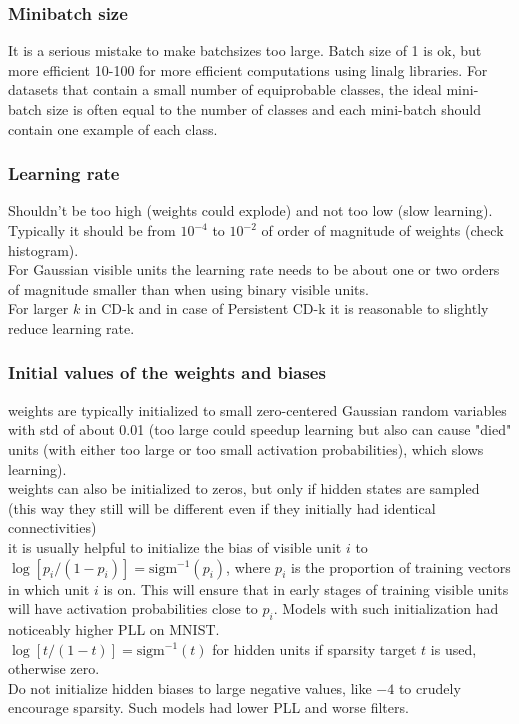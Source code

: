 \subsubsection{Minibatch size}
\good It is a serious mistake to make batchsizes too large. Batch size of 1 is ok, but more efficient 10-100 for more efficient computations using linalg libraries. For datasets that contain a small number of equiprobable classes, the ideal mini-batch size is often
equal to the number of classes and each mini-batch should contain one example of each class.

\subsubsection{Learning rate}
\good Shouldn't be too high (weights could explode) and not too low (slow learning). Typically it should be from $10^{-4}$ to $10^{-2}$ of order of magnitude of weights (check histogram).
\\
\good For Gaussian visible units the learning rate needs to be about one or two orders of magnitude smaller than when using binary visible units.
\\
\textbullet{} For larger $k$ in CD-k and in case of Persistent CD-k it is reasonable to slightly reduce learning rate.

\subsubsection{Initial values of the weights and biases}
\good weights are typically initialized to small zero-centered Gaussian random variables with std of about 0.01 (too large could speedup learning but also can cause "died" units (with either too large or too small activation probabilities), which slows learning).
\\
\textbullet{} weights can also be initialized to zeros, but only if hidden states are sampled (this way they still will be different even if they initially had identical connectivities)
\\
\good it is usually helpful to initialize the bias of visible unit $i$ to $\log[p_i/(1-p_i)]=\text{sigm}^{-1}(p_i)$, where $p_i$ is the proportion of training vectors in which unit $i$ is on. This will ensure that in early stages of training visible units will have activation probabilities close to $p_i$. Models with such initialization had noticeably higher PLL on MNIST.
\\
\textbullet{} $\log[t/(1-t)]=\text{sigm}^{-1}(t)$ for hidden units if sparsity target $t$ is used, otherwise zero.
\\
\bad Do not initialize hidden biases to large negative values, like $-4$ to crudely encourage sparsity. Such models had lower PLL and worse filters.

